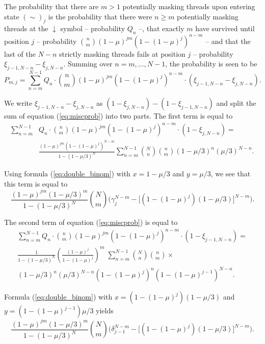 \documentclass{article}
\begin{document}
The probability that there are $m>1$ potentially masking threads upon
entering state $(\sim)_j$ is the probability that there were $n \geq m$
potentially masking threads at the $\downarrow$ symbol -- probability
$Q_n$ --, that exactly $m$ have survived until position $j$ -- probability
${n \choose m} (1-\mu)^{jm} (1-(1-\mu)^j)^{n-m}$ -- and that the last of
the $N-n$ strictly masking threads fails at position $j$ -- probability
$\xi_{j-1,N-n}-\xi_{j,N-n}$. Summing over $n = m, \ldots, N-1$, the
probability is seen to be
\begin{equation}
\label{eq:miscprob}
P_{m,j} = \sum_{n=m}^{N-1} Q_n \cdot {n \choose m} (1-\mu)^{jm}
(1-(1-\mu)^j)^{n-m} \cdot (\xi_{j-1,N-n}-\xi_{j,N-n}).
\end{equation}

We write $\xi_{j-1,N-n}-\xi_{j,N-n}$ as $(1-\xi_{j,N-n}) -
(1-\xi_{j-1,N-n})$ and split the sum of equation (\ref{eq:miscprob}) into
two parts. The first term is equal to
\begin{equation*}
\begin{split}
\sum_{n=m}^{N-1} & Q_n \cdot {n \choose m} (1-\mu)^{jm} (1-(1-\mu)^j)^{n-m}
\cdot (1 - \xi_{j,N-n}) = \\
& \frac{(1-\mu)^{jm} (1-(1-\mu)^j)^{N-m}}{1-(1-\mu/3)^N}
\sum_{n=m}^{N-1} {N \choose n} {n \choose m} (1-\mu/3)^n (\mu/3)^{N-n}.
\end{split}
\end{equation*}

Using formula (\ref{eq:double_binom}) with $x=1-\mu/3$ and $y=\mu/3$, we
see that this term is equal to
\begin{equation*}
\frac{(1-\mu)^{jm} (1-\mu/3)^m}{1-(1-\mu/3)^N} {N \choose m} 
\bigg( \gamma_j^{N-m}
-\big[ (1-(1-\mu)^j)(1-\mu/3)\big]^{N-m} \bigg).
\end{equation*}

The second term of equation (\ref{eq:miscprob}) is equal to
\begin{multline*}
\sum_{n=m}^{N-1} Q_n \cdot {n \choose m} (1-\mu)^{jm} (1-(1-\mu)^j)^{n-m}
\cdot (1 - \xi_{j-1,N-n}) = \\
\frac{1}{1-(1-\mu/3)^N}
\left(\frac{(1-\mu)^j}{1-(1-\mu)^j}\right)^m
\; \sum_{n=m}^{N-1} {N \choose n} {n \choose m} \times \\
(1-\mu/3)^n (\mu/3)^{N-n}
(1-(1-\mu)^j)^n (1-(1-\mu)^{j-1})^{N-n}.
\end{multline*}

Formula (\ref{eq:double_binom}) with $x=(1-(1-\mu)^j)(1-\mu/3)$ and
$y = (1-(1-\mu)^{j-1})\mu/3$ yields
\begin{equation*}
\frac{(1-\mu)^{jm} (1-\mu/3)^m}{1-(1-\mu/3)^N} {N \choose m}
\bigg( \delta_{j-1}^{N-m}
-\big[ (1-(1-\mu)^j)(1-\mu/3)\big]^{N-m} \bigg).
\end{equation*}
\end{document}
